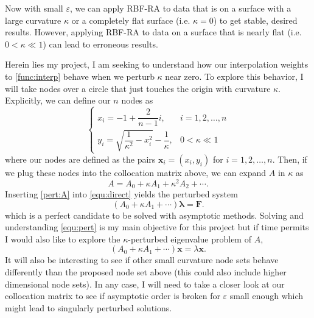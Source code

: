 \documentclass[a4paper,11pt]{article}
\newcommand{\eps}{\varepsilon}
\begin{document}
Now with small $ \eps $, we can apply RBF-RA to data that is on a surface with a large curvature $ \kappa $ or a completely flat surface (i.e. $ \kappa = 0 $) to get stable, desired results. However, applying RBF-RA to data on a surface that is nearly flat (i.e. $ 0 < \kappa \ll 1 $) can lead to erroneous results. 

Herein lies my project, I am seeking to understand how our interpolation weights to \eqref{func:interp} behave when we perturb $ \kappa $ near zero. To explore this behavior, I will take nodes over a circle that just touches the origin with curvature $ \kappa $. Explicitly, we can define our $ n $ nodes as
\[
	\begin{cases}
		x_i = -1 + \dfrac{2}{n - 1} i, & i = 1, 2, \ldots, n \\
		y_i = \sqrt{\dfrac{1}{\kappa^2} - x_i^2} - \dfrac{1}{\kappa}, & 0 < \kappa \ll 1
	\end{cases}
\]
where our nodes are defined as the pairs $ \mathbf{x}_i = (x_i, y_i) $ for $ i = 1, 2, \ldots, n $. Then, if we plug these nodes into the collocation matrix above, we can expand $ A $ in $ \kappa $ as
\begin{equation}
	A = A_0 + \kappa A_1 + \kappa^2 A_2 + \cdots. \label{pert:A}
\end{equation}
Inserting \eqref{pert:A} into \eqref{equ:direct} yields the perturbed system
\begin{equation}
	(A_0 + \kappa A_1 + \cdots) \pmb{\lambda} = \mathbf{F}. \label{equ:pert}
\end{equation}
which is a perfect candidate to be solved with asymptotic methods. Solving and understanding \eqref{equ:pert} is my main objective for this project but if time permits I would also like to explore the $ \kappa $-perturbed eigenvalue problem of $ A $,
\[
		(A_0 + \kappa A_1 + \cdots) \mathbf{x} = \lambda \mathbf{x}.
\]
 It will also be interesting to see if other small curvature node sets behave differently than the proposed node set above (this could also include higher dimensional node sets). In any case, I will need to take a closer look at our collocation matrix to see if asymptotic order is broken for $ \eps $ small enough which might lead to singularly perturbed solutions.
\end{document}
